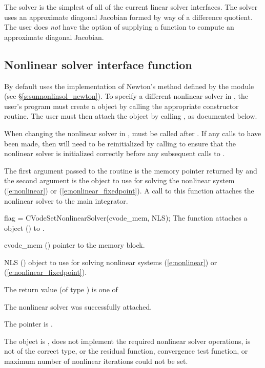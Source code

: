 {
  The {\cvdiag} solver is the simplest of all of the current {\cvode}
  linear solver interfaces.  The {\cvdiag} solver uses an approximate
  diagonal Jacobian formed by way of a difference quotient. The user
  does {\em not} have the option of supplying a function to compute an
  approximate diagonal Jacobian.
}
\subsection{Nonlinear solver interface function}
\label{ss:nonlin_solv_init}

By default {\cvode} uses the {\sunnonlinsol} implementation of Newton's method
defined by the {\sunnonlinsolnewton} module (see \S\ref{s:sunnonlinsol_newton}).
To specify a different nonlinear solver in {\cvode}, the user's program must
create a {\sunnonlinsol} object by calling the appropriate constructor routine.
The user must then attach the {\sunnonlinsol} object by calling
, as documented below.

When changing the nonlinear solver in {\cvode},  must
be called after . If any calls to  have been made, then
{\cvode} will need to be reinitialized by calling  to ensure
that the nonlinear solver is initialized correctly before any subsequent calls
to .

The first argument passed to the routine  is the
{\cvode} memory pointer returned by  and the second argument is
the {\sunnonlinsol} object to use for solving the nonlinear system
(\ref{e:nonlinear}) or (\ref{e:nonlinear_fixedpoint}).
A call to this function attaches the nonlinear solver to the main {\cvode}
integrator.

{
  flag = CVodeSetNonlinearSolver(cvode\_mem, NLS);
}
{
  The function  attaches a {\sunnonlinsol}
  object () to {\cvode}.
}
{
  \begin{args}
  \item[cvode\_mem] ()
    pointer to the {\cvode} memory block.
  \item[NLS] ()
    {\sunnonlinsol} object to use for solving nonlinear systems
    (\ref{e:nonlinear}) or (\ref{e:nonlinear_fixedpoint}).
  \end{args}
}
{
  The return value  (of type ) is one of
  \begin{args}
  \item[\Id{CV\_SUCCESS}]
    The nonlinear solver was successfully attached.
  \item[\Id{CV\_MEM\_NULL}]
    The  pointer is .
  \item[\Id{CV\_ILL\_INPUT}]
    The {\sunnonlinsol} object is , does not implement the required
    nonlinear solver operations, is not of the correct type, or the residual
    function, convergence test function, or maximum number of nonlinear
    iterations could not be set.
  \end{args}
}
{}

